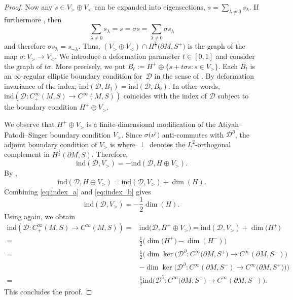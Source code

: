 \documentclass[11pt]{article}
\numberwithin{equation}{section}
\numberwithin{equation}{section}
\begin{document}
\begin{proof}
Now any $s\in V_>\oplus V_<$ can be expanded into eigensections, $s=\sum_{\lambda\neq0}s_\lambda$.
If furthermore , then
\[
\sum_{\lambda\neq0}s_\lambda
=
s
=
\sigma s
=
\sum_{\lambda\neq0}\sigma s_\lambda
\]
and therefore $
\sigma s_\lambda = s_{-\lambda}$. Thus, $(V_>\oplus V_<) \cap H^{\frac{1}{2}}\big(\partial M,S^+\big)$ is the graph of the map $\sigma\colon V_> \to V_<$.
We introduce a deformation parameter $t\in [0,1]$ and consider the graph of $t\sigma$.
More precisely, we put $B_t := H^+ \oplus \{s+t\sigma s \colon s \in V_>\}$.
Each $B_t$ is an $\infty$-regular elliptic boundary condition for~$\mathcal{D}$ in the sense of \cite{Baer-Ballmann}.
By deformation invariance of the index, $\mathrm{ind}(\mathcal{D},B_1) = \mathrm{ind}(\mathcal{D},B_0)$. In other words, $\mathrm{ind}(\mathcal{D}\colon C^\infty_+(M,S)\to C^\infty(M,S))$ coincides with the index of $\mathcal{D}$ subject to the boundary condition $H^+\oplus V_>$.

We observe that $H^+\oplus V_>$ is a finite-dimensional modification of the Atiyah--Patodi--Singer boundary condition $V_>$.
Since $\sigma\big(\nu^\flat\big)$ anti-commutes with $\mathcal{D}^\partial$, the adjoint boundary condition of $V_>$ is  where $\perp$ denotes the $L^2$-orthogonal complement in $H^{\frac{1}{2}}(\partial M,S)$. Therefore,
\begin{equation} \label{eq:index_a}
\mathrm{ind}(\mathcal{D},V_>) = -\mathrm{ind}(\mathcal{D},H\oplus V_>).
\end{equation}
By \cite[Corollary~8.8]{Baer-Ballmann},
\begin{equation} \label{eq:index_b}
\mathrm{ind}(\mathcal{D},H\oplus V_>) = \mathrm{ind}(\mathcal{D},V_>)+\dim(H).
\end{equation}
Combining \eqref{eq:index_a} and \eqref{eq:index_b} gives
\[
\mathrm{ind}(\mathcal{D},V_>)
=
-\frac{1}{2} \dim(H).
\]
Using \cite[Corollary~8.8]{Baer-Ballmann} again, we obtain
\begin{align*}
\mathrm{ind}(\mathcal{D}\colon C^\infty_+(M,S)\to C^\infty(M,S))
={}&
\mathrm{ind}\big(\mathcal{D},H^+\oplus V_>\big) =
\mathrm{ind}(\mathcal{D},V_>)+\dim\big(H^+\big) \\
={}&
\frac{1}{2} \big(\dim\big(H^+\big)-\dim(H^-)\big) \\
={}&
\frac{1}{2} \big(\dim\ker\big(\mathcal{D}^\partial\colon C^\infty\big(\partial M,S^+\big)\to C^\infty(\partial M,S^-)\big) \\
& -\dim\ker\big(\mathcal{D}^\partial\colon C^\infty(\partial M,S^-)\to C^\infty\big(\partial M,S^+\big)\big)\big) \\
={}&
\frac{1}{2} \mathrm{ind}\big(\mathcal{D}^\partial\colon C^\infty\big(\partial M,S^+\big)\to C^\infty(\partial M,S^-)\big) .
\end{align*}
This concludes the proof.
\end{proof}
\end{document}
